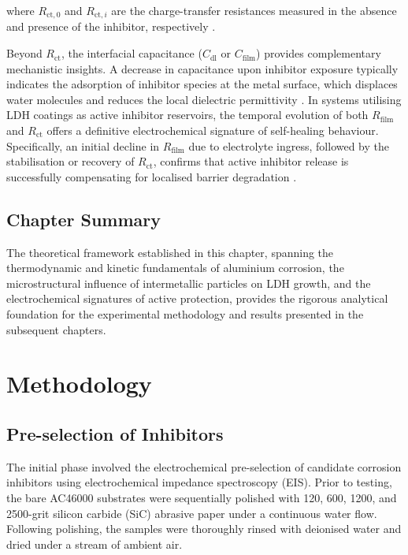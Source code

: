 \documentclass[11pt,twoside,a4paper,final]{report}
\begin{document}
where $R_{\text{ct},0}$ and $R_{\text{ct},i}$ are the charge-transfer resistances measured in the absence and presence of the inhibitor, respectively \cite{Lamaka2007, Orazem2008}. 

Beyond $R_{\text{ct}}$, the interfacial capacitance ($C_{\text{dl}}$ or $C_{\text{film}}$) provides complementary mechanistic insights. A decrease in capacitance upon inhibitor exposure typically indicates the adsorption of inhibitor species at the metal surface, which displaces water molecules and reduces the local dielectric permittivity \cite{Sastri2007, Orazem2008}. In systems utilising LDH coatings as active inhibitor reservoirs, the temporal evolution of both $R_{\text{film}}$ and $R_{\text{ct}}$ offers a definitive electrochemical signature of self-healing behaviour. Specifically, an initial decline in $R_{\text{film}}$ due to electrolyte ingress, followed by the stabilisation or recovery of $R_{\text{ct}}$, confirms that active inhibitor release is successfully compensating for localised barrier degradation \cite{BoualiReview2020, MartinezViademonte2020, Tedim2010}.

\section*{Chapter Summary}

The theoretical framework established in this chapter, spanning the thermodynamic and kinetic fundamentals of aluminium corrosion, the microstructural influence of intermetallic particles on LDH growth, and the electrochemical signatures of active protection, provides the rigorous analytical foundation for the experimental methodology and results presented in the subsequent chapters.

\chapter{Methodology}

\section{Pre-selection of Inhibitors}
\label{sec:inhibitor_selection}

The initial phase involved the electrochemical pre-selection of candidate corrosion inhibitors using electrochemical impedance spectroscopy (EIS). Prior to testing, the bare AC46000 substrates were sequentially polished with 120, 600, 1200, and 2500-grit silicon carbide (SiC) abrasive paper under a continuous water flow. Following polishing, the samples were thoroughly rinsed with deionised water and dried under a stream of ambient air.
\end{document}

